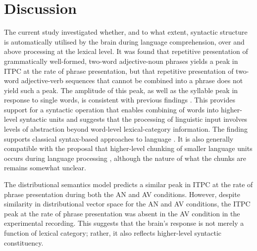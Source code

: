 \documentclass[10pt,letterpaper]{article}
\newcommand{\citet}[1]{\cite{#1}}
\begin{document}
\section*{Discussion}


The current study investigated whether, and to what extent, syntactic structure is automatically utilised by the brain during language comprehension, over and above processing at the lexical level. It was found that repetitive presentation of grammatically well-formed, two-word adjective-noun phrases yields a peak in ITPC at the rate of phrase presentation, but that repetitive presentation of two-word adjective-verb sequences that cannot be combined into a phrase does not yield such a peak. The amplitude of this peak, as well as the syllable peak in response to single words, is consistent with previous findings \citet{DingEtAl2017}. This provides support for a syntactic operation that enables combining of words into higher-level syntactic units and suggests that the processing of linguistic input involves levels of abstraction beyond word-level lexical-category information. The finding supports classical syntax-based approaches to language \citet{BerwickEtAl2013,EveraertEtAl2015,Chomsky1995}. It is also generally compatible with the proposal that higher-level chunking of smaller language units occurs during language processing \citet{ChristiansenChater2016}, although the nature of what the chunks are remains somewhat unclear.

The distributional semantics model predicts a similar peak in ITPC at the rate of phrase presentation during both the AN and AV conditions. However, despite similarity in distributional vector space for the AN and AV conditions, the ITPC peak at the rate of phrase presentation was absent in the AV condition in the experimental recording. This suggests that the brain's response is not merely a function of lexical category; rather, it also reflects higher-level syntactic constituency.
\end{document}
